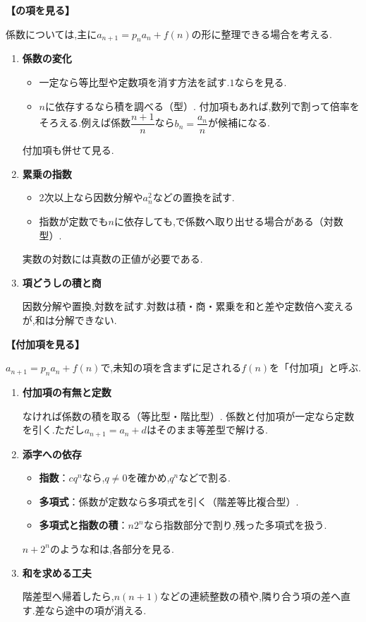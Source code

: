   \medskip
  \noindent \textbf{【の項を見る】}

  係数については,主に$a_{n+1}=p_na_n+f(n)$の形に整理できる場合を考える.
  \begin{enumerate}
    \item \textbf{係数の変化}

      \begin{itemize}[beginpenalty=10000]
        \item 一定なら等比型や定数項を消す方法を試す.$1$ならを見る.
        \item $n$に依存するなら積を調べる（型）.
              付加項もあれば,数列で割って倍率をそろえる.例えば係数$\dfrac{n+1}{n}$なら$b_n=\dfrac{a_n}{n}$が候補になる.
      \end{itemize}
      付加項も併せて見る.

    \item \textbf{累乗の指数}

      \begin{itemize}[beginpenalty=10000]
        \item 2次以上なら因数分解や$a_n^2$などの置換を試す.
        \item 指数が定数でも$n$に依存しても,で係数へ取り出せる場合がある（対数型）.
      \end{itemize}
      実数の対数には真数の正値が必要である.

    \item \textbf{項どうしの積と商}

      因数分解や置換,対数を試す.対数は積・商・累乗を和と差や定数倍へ変えるが,和は分解できない.
  \end{enumerate}

  \medskip
  \noindent \textbf{【付加項を見る】}

  $a_{n+1}=p_na_n+f(n)$で,未知の項を含まずに足される$f(n)$を「付加項」と呼ぶ.
  \begin{enumerate}
    \item \textbf{付加項の有無と定数}

      なければ係数の積を取る（等比型・階比型）.
      係数と付加項が一定なら定数を引く.ただし$a_{n+1}=a_n+d$はそのまま等差型で解ける.

    \item \textbf{添字への依存}

      \begin{itemize}[beginpenalty=10000]
        \item \textbf{指数}：$cq^n$なら,$q\ne0$を確かめ,$q^n$などで割る.
        \item \textbf{多項式}：係数が定数なら多項式を引く（階差等比複合型）.
        \item \textbf{多項式と指数の積}：$n2^n$なら指数部分で割り,残った多項式を扱う.
      \end{itemize}
      $n+2^n$のような和は,各部分を見る.

    \item \textbf{和を求める工夫}

      階差型へ帰着したら,$n(n+1)$などの連続整数の積や,隣り合う項の差へ直す.差なら途中の項が消える.
  \end{enumerate}

